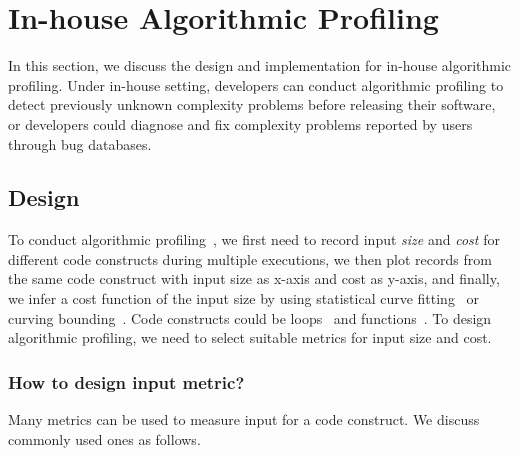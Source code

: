 \section{In-house Algorithmic Profiling}
\label{sec:inhouse}

In this section, we discuss the design and implementation for in-house algorithmic profiling.
Under in-house setting, 
developers can conduct algorithmic profiling 
to detect previously unknown complexity problems before releasing their software, 
or developers could diagnose and fix complexity problems 
reported by users through bug databases.


\subsection{Design}
To conduct algorithmic profiling~\cite{Aprof1,Aprof2,AlgoProf},
we first need to record input \textit{size} and \textit{cost} for different code constructs 
during multiple executions,
we then plot records from the same code construct with input size as x-axis and cost as y-axis, 
and finally, we infer a cost function of the input size by using 
statistical curve fitting~\cite{curve-fitting} 
or curving bounding~\cite{curve-bounding}. 
Code constructs could be loops~\cite{AlgoProf} and functions~\cite{Aprof1,Aprof2}. 
To design algorithmic profiling, we need to select 
suitable metrics for input size and cost. 




\subsubsection{How to design input metric?}
Many metrics can be used to measure input for a code construct. 
We discuss commonly used ones as follows.

